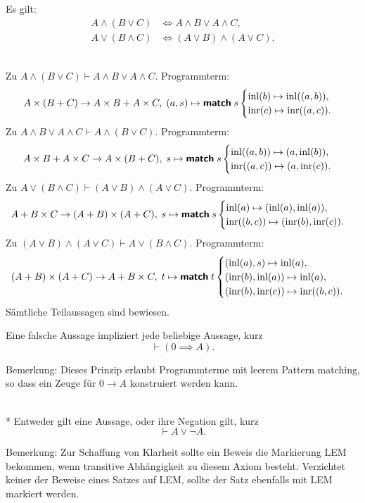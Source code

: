 \begin{Satz}%
\label{bool-dl}
Es gilt:
\begin{align}
A\land (B\lor C) &\iff A\land B\lor A\land C,\\
A\lor (B\land C) &\iff (A\lor B)\land (A\lor C).
\end{align}
\end{Satz}
\\
Zu $A\land (B\lor C) \vdash A\land B\lor A\land C$.
Programmterm:
\[A\times (B+C) \to A\times B + A\times C,\; (a, s)\mapsto \text{{\normalfont\sffamily\bfseries match}}\; s \begin{cases}
\operatorname{inl}(b)\mapsto \operatorname{inl}((a,b)),\\
\operatorname{inr}(c)\mapsto \operatorname{inr}((a,c)).
\end{cases}\]
Zu $A\land B\lor A\land C\vdash A\land (B\lor C)$.
Programmterm:
\[A\times B + A\times C\to A\times (B + C),\;
s\mapsto\text{{\normalfont\sffamily\bfseries match}}\; s\begin{cases}
\operatorname{inl}((a,b))\mapsto (a, \operatorname{inl}(b)),\\
\operatorname{inr}((a,c))\mapsto (a, \operatorname{inr}(c)).
\end{cases}
\]
Zu $A\lor (B\land C) \vdash (A\lor B)\land (A\lor C)$. Programmterm:
\[A+B\times C\to (A+B)\times (A+C),\;
s\mapsto\text{{\normalfont\sffamily\bfseries match}}\; s\begin{cases}
\operatorname{inl}(a)\mapsto (\operatorname{inl}(a),\operatorname{inl}(a)),\\
\operatorname{inr}((b,c))\mapsto (\operatorname{inr}(b),\operatorname{inr}(c)).
\end{cases} 
\]
Zu $(A\lor B)\land (A\lor C)\vdash A\lor (B\land C)$. Programmterm:
\[
(A+B)\times (A+C)\to A + B\times C,\;
t\mapsto\text{{\normalfont\sffamily\bfseries match}}\; t\begin{cases}
(\operatorname{inl}(a), s) \mapsto\operatorname{inl}(a),\\
(\operatorname{inr}(b), \operatorname{inl}(a)) \mapsto\operatorname{inl}(a),\\
(\operatorname{inr}(b), \operatorname{inr}(c)) \mapsto\operatorname{inr}((b, c)).
\end{cases}
\]
Sämtliche Teilaussagen sind bewiesen.\;\qedsymbol

\begin{Axiom}\label{PE}
Eine falsche Aussage impliziert jede beliebige Aussage, kurz
\[\vdash (0\implies A).\]
\end{Axiom}
Bemerkung: Dieses Prinzip erlaubt Programmterme mit leerem
Pattern matching, so dass ein Zeuge für $0\to A$ konstruiert
werden kann.

\begin{Axiom}\label{LEM}\mbox{}\\*
Entweder gilt eine Aussage, oder ihre Negation gilt, kurz
\[\vdash A\lor\neg A.\]
\end{Axiom}
Bemerkung: Zur Schaffung von Klarheit sollte ein Beweis die Markierung
LEM bekommen, wenn transitive Abhängigkeit zu diesem Axiom besteht.
Verzichtet keiner der Beweise eines Satzes auf LEM, sollte der Satz
ebenfalls mit LEM markiert werden.

